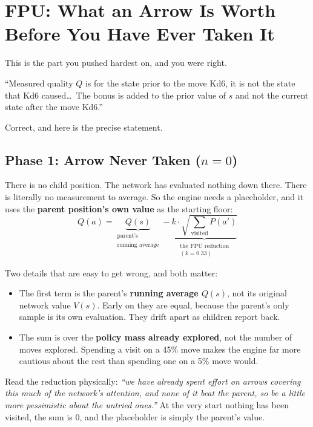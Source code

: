 \chapter{FPU: What an Arrow Is Worth Before You Have Ever Taken It}
\label{ch:fpu_transition}

This is the part you pushed hardest on, and you were right.

\begin{studentq}
``Measured quality $Q$ is for the state prior to the move Kd6, it is not the state that Kd6 caused\dots\ The bonus is added to the prior value of $s$ and not the current state after the move Kd6.''
\end{studentq}

Correct, and here is the precise statement.

\section{Phase 1: Arrow Never Taken ($n = 0$)}

There is no child position. The network has evaluated nothing down there. There is literally no measurement to average. So the engine needs a placeholder, and it uses the \textbf{parent position's own value} as the starting floor:
\begin{equation}
  Q(a) = \underbrace{Q(s)}_{\substack{\text{parent's} \\ \text{running average}}} - \underbrace{k \cdot \sqrt{\sum_{\text{visited}} P(a')}}_{\substack{\text{the FPU reduction} \\ (k = 0.33)}}
\end{equation}

Two details that are easy to get wrong, and both matter:
\begin{itemize}[leftmargin=2em]
  \item The first term is the parent's \textbf{running average $Q(s)$}, not its original network value $V(s)$. Early on they are equal, because the parent's only sample is its own evaluation. They drift apart as children report back.
  \item The sum is over the \textbf{policy mass already explored}, not the number of moves explored. Spending a visit on a 45\% move makes the engine far more cautious about the rest than spending one on a 5\% move would.
\end{itemize}

Read the reduction physically: \textit{``we have already spent effort on arrows covering this much of the network's attention, and none of it beat the parent, so be a little more pessimistic about the untried ones.''} At the very start nothing has been visited, the sum is 0, and the placeholder is simply the parent's value.

